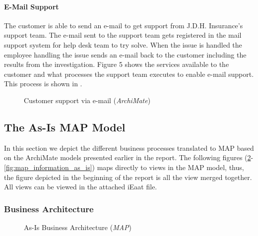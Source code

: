 \paragraph{E-Mail Support}
\label{sec:mail_support}
The customer is able to send an e-mail to get support from J.D.H. Insurance's support team. The e-mail sent to the support team gets registered in the mail support system for help desk team to try solve. When the issue is handled the employee handling the issue sends an e-mail back to the customer including the results from the investigation. Figure 5 shows the services available to the customer and what processes the support team executes to enable e-mail support. This process is shown in .
\begin{center}
	\begin{figure}[H]
		\centering
		\setlength\fboxsep{7pt}
		\setlength\fboxrule{0.5pt}
		\caption{Customer support via e-mail (\emph{ArchiMate})}
		\label{fig:archi_mail}
	\end{figure}
\end{center}
%
\subsection{The As-Is MAP Model}
\label{sec:as_is_map_model}
In this section we depict the different business processes translated to MAP based on the ArchiMate models presented earlier in the report. The following figures (\ref{fig:map_business_as_is}-\ref{fig:map_information_as_is}) maps directly to views in the MAP model, thus, the figure depicted in the beginning of the report is all the view merged together. All views can be viewed in the attached iEaat file.
%
\subsubsection{Business Architecture}
\begin{center}
	\begin{figure}[H]
		\centering
		\setlength\fboxsep{7pt}
		\setlength\fboxrule{0.5pt}
		\caption{As-Is Business Architecture (\emph{MAP})}
		\label{fig:map_business_as_is}
	\end{figure}
\end{center}
%
